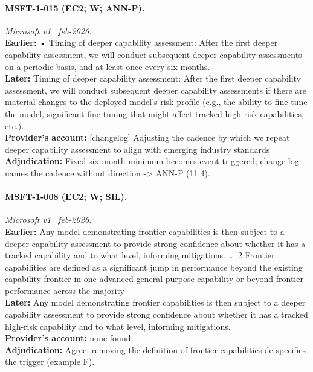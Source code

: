 \paragraph{MSFT-1-015 (EC2; W; ANN-P).} \emph{Microsoft v1 \textrightarrow\ feb-2026.}\\
\textbf{Earlier:} • Timing of deeper capability assessment: After the first deeper capability assessment, we will conduct subsequent deeper capability assessments on a periodic basis, and at least once every six months.\\
\textbf{Later:} Timing of deeper capability assessment: After the first deeper capability assessment, we will conduct subsequent deeper capability assessments if there are material changes to the deployed model's risk profile (e.g., the ability to fine-tune the model, significant fine-tuning that might affect tracked high-risk capabilities, etc.).\\
\textbf{Provider's account:} [changelog] Adjusting the cadence by which we repeat deeper capability assessment to align with emerging industry standards\\
\textbf{Adjudication:} Fixed six-month minimum becomes event-triggered; change log names the cadence without direction -> ANN-P (11.4).

\paragraph{MSFT-1-008 (EC2; W; SIL).} \emph{Microsoft v1 \textrightarrow\ feb-2026.}\\
\textbf{Earlier:} Any model demonstrating frontier capabilities is then subject to a deeper capability assessment to provide strong confidence about whether it has a tracked capability and to what level, informing mitigations. ... 2 Frontier capabilities are defined as a significant jump in performance beyond the existing capability frontier in one advanced general-purpose capability or beyond frontier performance across the majority \\
\textbf{Later:} Any model demonstrating frontier capabilities is then subject to a deeper capability assessment to provide strong confidence about whether it has a tracked high-risk capability and to what level, informing mitigations.\\
\textbf{Provider's account:} none found\\
\textbf{Adjudication:} Agree; removing the definition of frontier capabilities de-specifies the trigger (example F).


